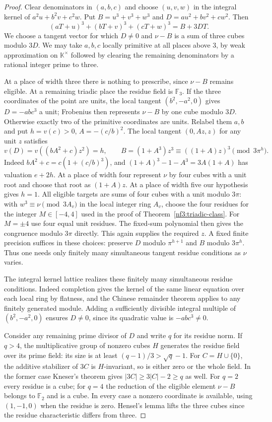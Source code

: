 \documentclass[11pt,letterpaper]{article}
\theoremstyle{definition}
\numberwithin{equation}{section}
\begin{document}
\begin{proof}
Clear denominators in $(a,b,c)$ and choose $(u,v,w)$ in the integral
kernel of $a^2u+b^2v+c^2w$. Put
$B=u^3+v^3+w^3$ and $D=au^2+bv^2+cw^2$. Then
\[
 (aT+u)^3+(bT+v)^3+(cT+w)^3=B+3DT .
\]
We choose a tangent vector for which $D\ne0$ and $\nu-B$ is a sum
of three cubes modulo $3D$. We may take $a,b,c$ locally primitive
at all places above $3$, by weak approximation on $\mathbb K^\times$
followed by clearing the remaining denominators by a rational integer
prime to three.

At a place of width three there is nothing to prescribe, since
$\nu-B$ remains eligible. At a remaining triadic place the residue
field is $\mathbb F_3$. If the three coordinates of the point are
units, the local tangent $(b^2,-a^2,0)$ gives $D=-abc^3$ a unit;
Frobenius then represents $\nu-B$ by one cube modulo $3D$.
Otherwise exactly two of the primitive coordinates are units.
Relabel them $a,b$ and put $h=v(c)>0$, $A=-(c/b)^2$. The local
tangent $(0,Az,z)$ for any unit $z$ satisfies
\[
 v(D)=v((bA^2+c)z^2)=h,\qquad
 B=(1+A^3)z^3\equiv((1+A)z)^3\pmod{3\pi^h}.
\]
Indeed $bA^2+c=c(1+(c/b)^3)$, and
$(1+A)^3-1-A^3=3A(1+A)$ has valuation $e+2h$.
At a place of width four represent $\nu$ by four cubes with a unit
root and choose that root as $(1+A)z$. At a place of width five
our hypothesis gives $h=1$. All eligible targets are sums of four
cubes with a unit modulo $3\pi$: with $w^3\equiv\nu\pmod{3A_v}$
in the local integer ring $A_v$, choose the four residues for the
integer $M\in[-4,4]$ used in the proof of
Theorem~\ref{nf3:triadic-class}. For $M=\pm4$ use four equal
unit residues. The fixed-sum polynomial then gives the congruence
modulo $3\pi$ directly. This again supplies the required $z$.
A fixed finite precision suffices in these choices: preserve $D$
modulo $\pi^{h+1}$ and $B$ modulo $3\pi^h$. Thus one needs only
finitely many simultaneous tangent residue conditions as $\nu$ varies.

The integral kernel lattice realizes these finitely many simultaneous
residue conditions. Indeed completion gives the kernel of the same
linear equation over each local ring by flatness, and the Chinese
remainder theorem applies to any finitely generated module.
Adding a sufficiently divisible integral multiple of $(b^2,-a^2,0)$
ensures $D\ne0$, since its quadratic value is $-abc^3\ne0$.

Consider any remaining prime divisor of $D$ and write $q$ for its
residue norm. If $q>4$, the multiplicative group of nonzero cubes
$H$ generates the residue field over its prime field: its size is at
least $(q-1)/3>\sqrt q-1$. For $C=H\cup\{0\}$, the additive
stabilizer of $3C$ is $H$-invariant, so is either zero or the whole
field. In the former case Kneser's theorem \cite{edkneser} gives
$|3C|\ge3|C|-2\ge q$ as well. For $q=2$ every residue is a cube;
for $q=4$ the reduction of the eligible element $\nu-B$ belongs to
$\mathbb F_2$ and is a cube. In every case a nonzero coordinate
is available, using $(1,-1,0)$ when the residue is zero. Hensel's
lemma lifts the three cubes since the residue characteristic differs
from three.


\end{proof}
\end{document}
